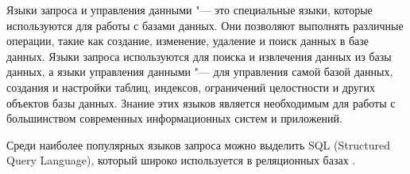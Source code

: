 Языки запроса и управления данными "--- это специальные языки, которые используются для работы с базами данных. Они позволяют выполнять различные операции, такие как создание, изменение, удаление и поиск данных в базе данных. Языки запроса используются для поиска и извлечения данных из базы данных, а языки управления данными "--- для управления самой базой данных, создания и настройки таблиц, индексов, ограничений целостности и других объектов базы данных. Знание этих языков является необходимым для работы с большинством современных информационных систем и приложений.

Среди наиболее популярных языков запроса можно выделить SQL (Structured Query Language), который широко используется в реляционных базах \cite{6}.